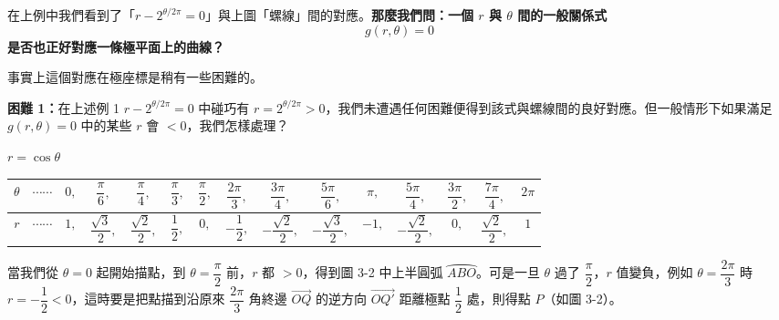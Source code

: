 在上例中我們看到了「$r - 2^{\theta/2\pi} = 0$」與上圖「螺線」間的對應。\textbf{那麼我們問：一個 $r$ 與 $\theta$ 間的一般關係式}
\begin{equation}\label{eq:b5-1-3-2}
  g(r, \theta) = 0 \tag{2}
\end{equation}
\textbf{是否也正好對應一條極平面上的曲線？}

事實上這個對應在極座標是稍有一些困難的。

\medskip
\noindent\textbf{困難 1：}在上述例 1 $r - 2^{\theta/2\pi} = 0$ 中碰巧有 $r = 2^{\theta/2\pi} > 0$，我們未遭遇任何困難便得到該式與螺線間的良好對應。但一般情形下如果滿足 $g(r, \theta) = 0$ 中的某些 $r$ 會 $< 0$，我們怎樣處理？

\medskip
\begin{example}\label{ex:b5-1-3-2}
$r = \cos\theta$

\begin{center}
\renewcommand{\arraystretch}{1.6}
\setlength{\tabcolsep}{4.5pt}
\small
\begin{tabular}{c|cccccccccccccc}
$\theta$ & $\cdots\cdots$ & $0,$ & $\dfrac{\pi}{6},$ & $\dfrac{\pi}{4},$ & $\dfrac{\pi}{3},$ & $\dfrac{\pi}{2},$ & $\dfrac{2\pi}{3},$ & $\dfrac{3\pi}{4},$ & $\dfrac{5\pi}{6},$ & $\pi,$ & $\dfrac{5\pi}{4},$ & $\dfrac{3\pi}{2},$ & $\dfrac{7\pi}{4},$ & $2\pi$ \\[4pt]
\hline
$r$ & $\cdots\cdots$ & $1,$ & $\dfrac{\sqrt{3}}{2},$ & $\dfrac{\sqrt{2}}{2},$ & $\dfrac{1}{2},$ & $0,$ & $-\dfrac{1}{2},$ & $-\dfrac{\sqrt{2}}{2},$ & $-\dfrac{\sqrt{3}}{2},$ & $-1,$ & $-\dfrac{\sqrt{2}}{2},$ & $0,$ & $\dfrac{\sqrt{2}}{2},$ & $1$
\end{tabular}
\end{center}

當我們從 $\theta = 0$ 起開始描點，到 $\theta = \dfrac{\pi}{2}$ 前，$r$ 都 $> 0$，得到圖 3-2 中上半圓弧 $\wideparen{ABO}$。可是一旦 $\theta$ 過了 $\dfrac{\pi}{2}$，$r$ 值變負，例如 $\theta = \dfrac{2\pi}{3}$ 時 $r = -\dfrac{1}{2} < 0$，這時要是把點描到沿原來 $\dfrac{2\pi}{3}$ 角終邊 $\vec{OQ}$ 的逆方向 $\vec{OQ'}$ 距離極點 $\dfrac{1}{2}$ 處，則得點 $P$（如圖 3-2）。

\begin{figure}[H]
\centering
{}
\end{figure}
\end{example}
